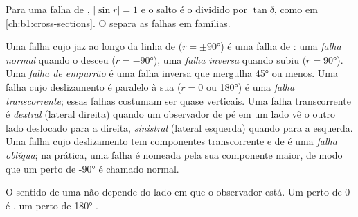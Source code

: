 Para uma falha de , $|\sin r| = 1$ e o salto é o  dividido por $\tan\delta$, como em \cref{ch:b1:cross-sections}. O  separa as falhas em famílias.

\begin{definition}\label{def:b1:faults-folds-fabrics:fault-types}
Uma falha cujo  jaz ao longo da linha de  ($r = \pm\ang{90}$) é uma falha de : uma \emph{falha normal} quando o  desceu ($r = \ang{-90}$), uma \emph{falha inversa} quando subiu ($r = \ang{90}$). Uma \emph{falha de empurrão} é uma falha inversa que mergulha \ang{45} ou menos. Uma falha cujo deslizamento é paralelo à sua  ($r = 0$ ou \ang{180}) é uma \emph{falha transcorrente}; essas falhas costumam ser quase verticais. Uma falha transcorrente é \emph{dextral} (lateral direita) quando um observador de pé em um lado vê o outro lado deslocado para a direita, \emph{sinistral} (lateral esquerda) quando para a esquerda. Uma falha cujo deslizamento tem componentes transcorrente e de  é uma \emph{falha oblíqua}; na prática, uma falha é nomeada pela sua componente maior, de modo que um  perto de \ang{-90} é chamado normal.
\end{definition}

\begin{proposition}\label{prop:b1:faults-folds-fabrics:sense}
O sentido de uma  não depende do lado em que o observador está. Um  perto de $0$ é , um  perto de \ang{180} .
\end{proposition}

